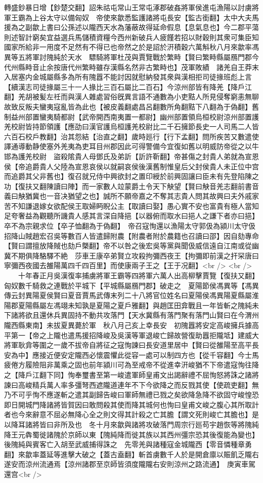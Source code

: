 轉盛鈔暴日增【鈔楚交翻】詔朱祜屯常山王常屯涿郡破姦將軍侯進屯漁陽以討虜將軍王霸為上谷太守以備匈奴　帝使來歙悉監護諸將屯長安【監古銜翻】太中大夫馬援為之副歙上書曰公孫述以隴西天水為藩蔽故得延命假息【息氣息也】今二郡平蕩則述智計窮矣宜益選兵馬儲積資糧今西州新破兵人疲饉若招以財穀則其衆可集臣知國家所給非一用度不足然有不得已也帝然之於是詔於汧積穀六萬斛秋八月來歙率馮異等五將軍討隗純於天水　驃騎將軍杜茂與賈覽戰於繁畤【賢曰繁畤縣屬鴈門郡今代州縣畤音止余按唐代州繁畤雖存漢縣名然非古繁畤也】茂軍敗績　諸羌自王莽末入居塞内金城屬縣多為所有隗囂不能討因就慰納發其衆與漢相拒司徒掾班彪上言【續漢志司徒掾屬三十一人掾比三百石屬比二百石】今涼州部皆有降羌【降戶江翻】羌胡被髪左祍而與漢人雜處習俗旣異言語不通數為小吏黠人所見侵奪窮恚無聊故致反叛夫蠻夷寇亂皆為此也【被皮義翻處昌呂翻數所角翻黠下八翻為于偽翻】舊制益州部置蠻夷騎都尉【武帝開西南夷置一都尉】幽州部置領烏桓校尉涼州部置護羌校尉皆持節領護【應劭曰漢官護烏桓護羌校尉比二千石擁節長史一人司馬二人皆六百石校戶教翻】治其怨結【治直之翻】歲時廵行【行下孟翻】問所疾苦又數遣使譯通導動静使塞外羌夷為吏耳目州郡因此可得警備今宜復如舊以明威防帝從之以牛邯為護羌校尉　盜殺隂貴人母鄧氏及弟訢【訢許靳翻】帝甚傷之封貴人弟就為宣恩侯【帝追爵貴人父陸為宣恩哀侯以就嗣哀侯後漢舊制惟皇后父封侯貴人未正位中宫而追爵其父非舊也】復召就兄侍中興欲封之置印綬於前興固讓曰臣未有先登陷陳之功【復扶又翻陳讀曰陣】而一家數人竝蒙爵土令天下觖望【賢曰觖音羌志翻前書音義曰觖猶冀也一音决猶望之也】誠所不願帝嘉之不奪其志貴人問其故興曰夫外戚家苦不知謙退嫁女欲配侯王取婦眄睨公主【取讀曰娶】愚心實不安也富貴有極人當知足夸奢益為觀聽所譏貴人感其言深自降挹【以器俯而取水曰挹人之謙下者亦曰挹】卒不為宗親求位【卒子恤翻為于偽翻】　帝召寇恂還以漁陽太守郭伋為潁川太守伋招降山賊趙宏召吳等數百人皆遣歸附農【附農者附於農籍也召讀曰邵】因自劾專命【賢曰謂擅放降賊也劾戶槩翻】帝不以咎之後宏吳等黨與聞伋威信遠自江南或從幽冀不期俱降駱驛不絶　莎車王康卒弟賢立攻殺拘彌西夜王【拘彌即前漢之扞罙唐曰寧彌西夜國去雒陽萬四千四百里】而使康兩子王之【王于况翻】<br />
<br />
　　十年春正月吳漢復率捕虜將軍王霸等四將軍六萬人出高柳擊賈覽【復扶又翻】匈奴數千騎救之連戰於平城下【平城縣屬鴈門郡】破走之　夏陽節侯馮異等【馮異傳云封異陽夏侯賢曰夏音賈馬武傳末列二十八將官位姓名曰夏陽侯馮異陽夏縣屬淮陽郡夏陽縣屬左馮翊未知孰是夏陽之夏戶雅翻】與趙匡田弇戰且一年皆斬之隗純未下諸將欲且還休兵異固持不動共攻落門【天水冀縣有落門聚有落門山賢曰在今渭州隴西縣東南】未拔夏異薨於軍　秋八月己亥上幸長安　初隗囂將安定高峻擁兵據高平第一【帝之上隴也遣馬援招降峻及吳漢等軍退峻亡歸故營復助囂拒隴坻】建威大將軍耿弇等圍之一歲不拔帝自將征之寇恂諫曰長安道里居中【賢曰從雒陽至高平長安為中】應接近便安定隴西必懷震懼此從容一處可以制四方也【從千容翻】今士馬疲倦方履險阻非萬乘之固也前年潁川可為至戒帝不從進幸汧峻猶不下帝遣寇恂往降之【降戶江翻下同】恂奉璽書至第一峻遣軍師皇甫文出謁辭禮不屈恂怒將誅之諸將諫曰高峻精兵萬人率多彊弩西遮隴道連年不下今欲降之而反戮其使【使疏吏翻】無乃不可乎恂不應遂斬之遣其副歸告峻曰軍師無禮已戮之矣欲降急降不欲固守峻惶恐即日開城門降諸將皆賀因曰敢問殺其使而降其城何也恂曰皇甫文峻之腹心其所取計者也今來辭意不屈必無降心全之則文得其計殺之亡其膽【謂文死則峻亡其膽也】是以降耳諸將皆曰非所及也　冬十月來歙與諸將攻破落門周宗行廵苟宇趙恢等將隗純降王元犇蜀徙諸隗於京師以東【隗純降而徙其族以其西州彊宗恐其後復能為變也】後隗純與賓客亡入胡至武威捕得誅之　先零羌與諸種寇金城隴西【零音憐種章勇翻】來歙率蓋延等進擊大破之【蓋古盍翻】斬首虜數千人於是開倉廪以賑飢乏隴右遂安而涼州流通焉【涼州諸郡至京師皆須度隴隴右安則涼州之路流通】　庚寅車駕還宫<br />

